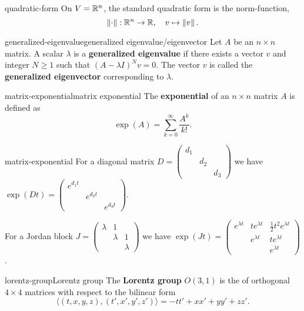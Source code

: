 \begin{example}{quadratic-form}
    On $V = \mathbb{R}^n$, the standard quadratic form is the norm-function,
    \[ \left\|\cdot\right\| : \mathbb{R}^n \to \mathbb{R}, \quad v \mapsto \left\|v\right\| . \]
\end{example}

\begin{topic}{generalized-eigenvalue}{generalized eigenvalue/eigenvector}
    Let $A$ be an $n \times n$ matrix. A scalar $\lambda$ is a \textbf{generalized eigenvalue} if there exists a vector $v$ and integer $N \ge 1$ such that $(A - \lambda I)^N v = 0$. The vector $v$ is called the \textbf{generalized eigenvector} corresponding to $\lambda$.
\end{topic}

\begin{topic}{matrix-exponential}{matrix exponential}
    The \textbf{exponential} of an $n \times n$ matrix $A$ is defined as
    \[ \exp(A) = \sum_{k = 0}^{\infty} \frac{A^k}{k!} . \]
\end{topic}

\begin{example}{matrix-exponential}
    For a diagonal matrix $D = \begin{pmatrix} d_1 & & \\ & d_2 & \\ & & d_3 \end{pmatrix}$ we have $\exp(D t) = \begin{pmatrix} e^{d_1 t} & & \\ & e^{d_2 t} & \\ & & e^{d_3 t} \end{pmatrix}$.
    
    For a Jordan block $J = \begin{pmatrix} \lambda & 1 & \\ & \lambda & 1 \\ & & \lambda \end{pmatrix}$ we have $\exp(J t) = \begin{pmatrix} e^{\lambda t} & t e^{\lambda t} & \tfrac{1}{2} t^2 e^{\lambda t} \\ & e^{\lambda t} & t e^{\lambda t} \\ & & e^{\lambda t} \end{pmatrix}$.
\end{example}

\begin{topic}{lorentz-group}{Lorentz group}
    The \textbf{Lorentz group} $O(3, 1)$ is the  of orthogonal $4 \times 4$ matrices with respect to the bilinear form
    \[ \langle (t, x, y, z), (t', x', y', z') \rangle = - tt' + xx' + yy' + zz' . \]
\end{topic}


